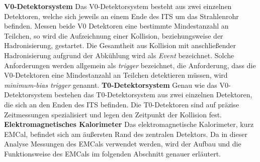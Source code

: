 \newline
\textbf{V0-Detektorsystem}
\newline
Das V0-Detektorsystem besteht aus zwei einzelnen Detektoren, welche sich jeweils an einem Ende des ITS um das Strahlenrohr befinden.
Messen beide V0 Detektoren eine bestimmte Mindestanzahl an Teilchen, so wird die Aufzeichnung einer Kollision, beziehungsweise der Hadronisierung, gestartet.
Die Gesamtheit aus Kollision mit anschlie{\ss}ender Hadronisierung aufgrund der Abk\"uhlung wird als \textit{Event} bezeichnet.
Solche Anforderungen werden allgemein als \textit{trigger} bezeichnet, die Anforderung, dass die V0-Detektoren eine Mindestanzahl an Teilchen detektieren m\"ussen, wird \textit{minimum-bias trigger} genannt.
\newline
\textbf{T0-Detektorsystem}
\newline
Genau wie das V0-Detektorsystem bestehen das T0-Detektorsystem aus zwei einzelnen Detektoren, die sich an den Enden des ITS befinden.
Die T0-Detektoren sind auf pr\"azise Zeitmessungen spezialisiert und legen den Zeitpunkt der Kollision fest.
\newline
\textbf{Elektromagnetisches Kalorimeter}
\newline
Das elektromagnetische Kalorimeter, kurz EMCal, befindet sich am \"au{\ss}ersten Rand des zentralen Detektors.
Da in dieser Analyse Messungen des EMCals verwendet werden, wird der Aufbau und die Funktionsweise des EMCals im folgenden Abschnitt genauer erl\"autert.
